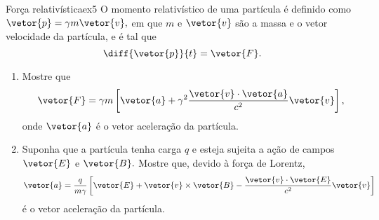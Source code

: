 \begin{exercício}{Força relativística}{ex5}
   O momento relativístico de uma partícula é definido como \(\vetor{p} = \gamma m \vetor{v},\) em que \(m\) e \(\vetor{v}\) são a massa e o vetor velocidade da partícula, e é tal que
   \begin{equation*}
      \diff{\vetor{p}}{t} = \vetor{F}.
   \end{equation*}
   \begin{enumerate}[label=(\alph*)]
       \item Mostre que
          \begin{equation*}
             \vetor{F} = \gamma m\left[\vetor{a} + \gamma^2 \frac{\vetor{v}\cdot\vetor{a}}{c^2}\vetor{v}\right],
          \end{equation*}
          onde \(\vetor{a}\) é o vetor aceleração da partícula.
       \item Suponha que a partícula tenha carga \(q\) e esteja sujeita a ação de campos \(\vetor{E}\) e \(\vetor{B}.\) Mostre que, devido à força de Lorentz, 
          \begin{equation*}
             \vetor{a} = \frac{q}{m \gamma} \left[\vetor{E} + \vetor{v} \times \vetor{B} - \frac{\vetor{v}\cdot \vetor{E}}{c^2}\vetor{v}\right]
          \end{equation*}
          é o vetor aceleração da partícula.
   \end{enumerate}
\end{exercício}
